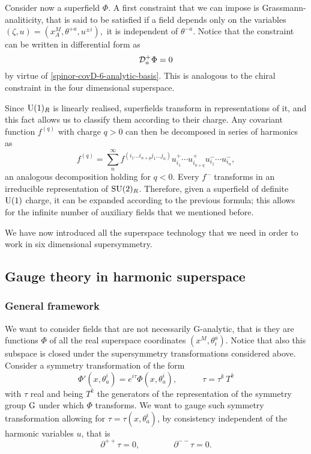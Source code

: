 Consider now a superfield $\Phi$.
A first constraint that we can impose  is Grassmann-analiticity, that is said to be satisfied  if a field depends only on the variables
\(
\left( \zeta, u \right)
	=
\left( x^M_A, \theta^{+a}, u^{\pm i} \right),
\)
\ie it is independent of $\theta^{-a}$.  Notice that the constraint can be written in differential form as
\begin{equation}
{ \mathcal{D} }^+_a \Phi = 0
\end{equation}
by virtue of \eqref{spinor-covD-6-analytic-basis}. This is analogous to the chiral constraint in the four dimensional superspace.

Since ${ \text{U} }(1)_R$ is linearly realised, superfields transform in representations of it, and this fact allows us to classify them according to their charge. Any covariant function $f^{(q)}$ with charge $q>0$ can then be decomposed in series of harmonics as
\begin{equation}
f^{(q)} = \sum_n^\infty f^{(i_1 \ldots i_{n+q} j_1 \ldots j_n )}
u^+_{i_1} \cdots u^+_{i_{n+q}} u^-_{i_1} \cdots  u^-_{i_n},
\end{equation}
an analogous decomposition holding for $q < 0$. Every $f^{\cdots}$ transforms in an irreducible representation of ${ \text{SU} }(2)_R$. Therefore, given a superfield of definite ${ \text{U} }(1)$ charge, it can be expanded according to the previous formula; this allows for the infinite number of auxiliary fields that we mentioned before.

We have now introduced all the superspace technology that we need in order to work in six dimensional supersymmetry.


\subsection{Gauge theory in harmonic superspace}

\subsubsection{General framework}

We want to consider fields that are not necessarily G-analytic, that is they are functions $\Phi$ of all the real superspace coordinates $(x^M,\theta^a_i)$. Notice that also this subspace is closed under the supersymmetry transformations considered above.  Consider a symmetry transformation of the form
\begin{equation}
\Phi'(x,\theta^i_a) =  e^{i \tau} \Phi(x,\theta^i_a),
\hspace{3em}
\tau = \tau^k \, T^k
\end{equation} 
with $\tau$ real and 
being $T^k$ the generators of the representation of the symmetry group ${ \text{G} }$ under which $\Phi$ transforms. We want to gauge such symmetry transformation allowing for $\tau = \tau(x,\theta^i_a)$, by consistency independent of the harmonic variables $u$, that is 
\begin{equation}
\partial^{++} \tau = 0 ,
\qquad\qquad
\partial^{--} \tau = 0 .
\end{equation} 


